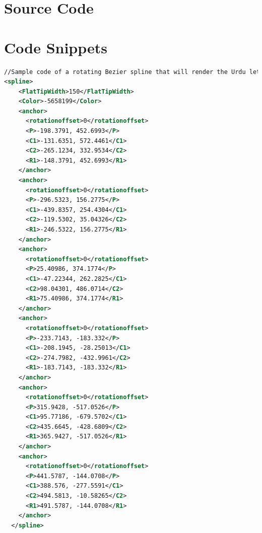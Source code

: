 \section{Source Code}\label{Appendix:sourceCode}
{
    \clearpage
}
\section{Code Snippets}\label{Appendix:CodeSnippets}
{
\begin{lstlisting}[language=XML]
//Sample code of a rotating Bezier spline that will render the Urdu letter Aa'en in Nastaleeq.
<spline>
    <FlatTipWidth>150</FlatTipWidth>
    <Color>-5658199</Color>
    <anchor>
      <rotationoffset>0</rotationoffset>
      <P>-198.3791, 452.6993</P>
      <C1>-131.6351, 572.4461</C1>
      <C2>-265.1234, 332.9534</C2>
      <R1>-148.3791, 452.6993</R1>
    </anchor>
    <anchor>
      <rotationoffset>0</rotationoffset>
      <P>-296.5323, 156.2775</P>
      <C1>-439.8357, 254.4304</C1>
      <C2>-119.5302, 35.04326</C2>
      <R1>-246.5322, 156.2775</R1>
    </anchor>
    <anchor>
      <rotationoffset>0</rotationoffset>
      <P>25.40986, 374.1774</P>
      <C1>-47.22344, 262.2825</C1>
      <C2>98.04301, 486.0714</C2>
      <R1>75.40986, 374.1774</R1>
    </anchor>
    <anchor>
      <rotationoffset>0</rotationoffset>
      <P>-233.7143, -183.332</P>
      <C1>-208.1945, -28.25013</C1>
      <C2>-274.7982, -432.9961</C2>
      <R1>-183.7143, -183.332</R1>
    </anchor>
    <anchor>
      <rotationoffset>0</rotationoffset>
      <P>315.9428, -517.0526</P>
      <C1>95.77186, -679.5702</C1>
      <C2>435.6645, -428.6809</C2>
      <R1>365.9427, -517.0526</R1>
    </anchor>
    <anchor>
      <rotationoffset>0</rotationoffset>
      <P>441.5787, -144.0708</P>
      <C1>388.576, -277.5591</C1>
      <C2>494.5813, -10.58265</C2>
      <R1>491.5787, -144.0708</R1>
    </anchor>
  </spline>
\end{lstlisting}
}

